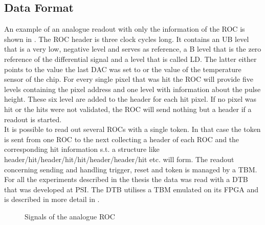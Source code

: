 \documentclass[british,11pt,a4paper]{memoir}
\begin{document}
\subsection{Data Format}\label{sdata}
An example of an analogue readout with only the information of the \ac{ROC} is shown in . The \ac{ROC} header is three clock cycles long. It contains an \ac{UB} level that is a very low, negative level and serves as reference, a \ac{B} level that is the zero reference of the differential signal and a level that is called \ac{LD}. The latter either points to the value the last \ac{DAC} was set to or the value of the temperature sensor of the chip. For every single pixel that was hit the \ac{ROC} will provide five levels containing the pixel address and one level with information about the pulse height. These six level are added to the header for each hit pixel. If no pixel was hit or the hits were not validated, the \ac{ROC} will send nothing but a header if a readout is started.\\
It is possible to read out several \ac{ROC}s with a single token. In that case the token is sent from one \ac{ROC} to the next collecting a header of each \ac{ROC} and the corresponding hit information s.t. a structure like header/hit/header/hit/hit/header/header/hit etc. will form. The readout concerning sending and handling trigger, reset and token is managed by a \ac{TBM}. For all the experiments described in the thesis the data was read with a \ac{DTB} that was developed at \ac{PSI}. The \ac{DTB} utilises a \ac{TBM} emulated on its \ac{FPGA} and is described in more detail in .\\
\begin{figure}[ht]
	\centering
	\hfill
	\caption{Signals of the analogue \ac{ROC}}
	\label{procsig}
\end{figure}\no
\end{document}
